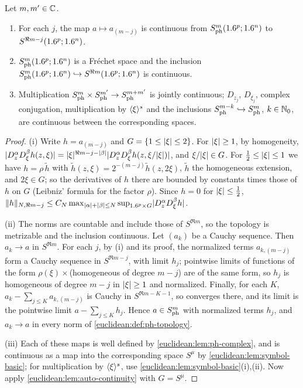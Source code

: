\begin{lemma}\label{euclidean:lem:ph-frechet}
  Let $m,m'\in\mathbb{C}$.
  \begin{enumerate}[label=\textup{(\roman*)}]
  \item For each $j$, the map $a\mapsto a_{(m-j)}$ is continuous from
    $S^{m}_{\mathrm{ph}}(1.6^p;1.6^n)$ to $S^{\Re m-j}(1.6^p;1.6^n)$.
  \item $S^{m}_{\mathrm{ph}}(1.6^p;1.6^n)$ is a Fr\'echet space and the inclusion
    $S^{m}_{\mathrm{ph}}(1.6^p;1.6^n)\hookrightarrow S^{\Re m}(1.6^p;1.6^n)$ is continuous.
  \item Multiplication $S^{m}_{\mathrm{ph}}\times S^{m'}_{\mathrm{ph}}\to S^{m+m'}_{\mathrm{ph}}$ is jointly
    continuous; $D_{z_j}$, $D_{\xi_j}$, complex conjugation, multiplication by
    $\langle \xi\rangle^s$ and the inclusions $S^{m-k}_{\mathrm{ph}}\hookrightarrow S^{m}_{\mathrm{ph}}$,
    $k\in\mathbb{N}_0$, are continuous between the corresponding spaces.
  \end{enumerate}
\end{lemma}
\begin{proof}
  (i) Write $h=a_{(m-j)}$ and $G=\{1\le\lvert \xi\rvert\le2\}$. For $\lvert \xi\rvert\ge1$, by
  homogeneity,
  $\lvert D^\alpha_zD^\beta_\xi h(z,\xi)\rvert=\lvert \xi\rvert^{\Re m-j-\lvert \beta\rvert}
  \lvert D^\alpha_zD^\beta_\xi h(z,\xi/\lvert \xi\rvert)\rvert$, and $\xi/\lvert \xi\rvert\in G$. For
  $\frac12\le\lvert \xi\rvert\le1$ we have $h=\rho\,\tilde h$ with
  $\tilde h(z,\xi)=2^{-(m-j)}\tilde h(z,2\xi)$, $\tilde h$ the homogeneous
  extension, and $2\xi\in G$; so the derivatives of $h$ there are bounded by
  constants times those of $h$ on $G$ (Leibniz' formula for the factor
  $\rho$). Since $h=0$ for $\lvert \xi\rvert\le\frac12$,
  $\lVert h\rVert_{N,\Re m-j}\le C_N\max_{\lvert \alpha\rvert+\lvert \beta\rvert\le N}\sup_{1.6^p\times G}
  \lvert D^\alpha_zD^\beta_\xi h\rvert$.

  (ii) The norms are countable and include those of $S^{\Re m}$, so the
  topology is metrizable and the inclusion continuous. Let $(a_k)$ be a
  Cauchy sequence. Then $a_k\to a$ in $S^{\Re m}$. For each $j$, by (i) and its
  proof, the normalized terms $a_{k,(m-j)}$ form a Cauchy sequence in
  $S^{\Re m-j}$, with limit $h_j$; pointwise limits of functions of the form
  $\rho(\xi)\times$(homogeneous of degree $m-j$) are of the same form, so $h_j$ is
  homogeneous of degree $m-j$ in $\lvert \xi\rvert\ge1$ and normalized. Finally, for
  each $K$, $a_k-\sum_{j\le K}a_{k,(m-j)}$ is Cauchy in $S^{\Re m-K-1}$, so
  converges there, and its limit is the pointwise limit
  $a-\sum_{j\le K}h_j$. Hence $a\in S^{m}_{\mathrm{ph}}$ with normalized terms $h_j$,
  and $a_k\to a$ in every norm of \cref{euclidean:def:ph-topology}.

  (iii) Each of these maps is well defined by
  \cref{euclidean:lem:ph-complex}, and is continuous as a map into the
  corresponding space $S^{\mu}$ by \cref{euclidean:lem:symbol-basic}; for
  multiplication by $\langle \xi\rangle^s$, use \cref{euclidean:lem:symbol-basic}(i),(ii). Now
  apply \cref{euclidean:lem:auto-continuity} with $G=S^\mu$.
\end{proof}

